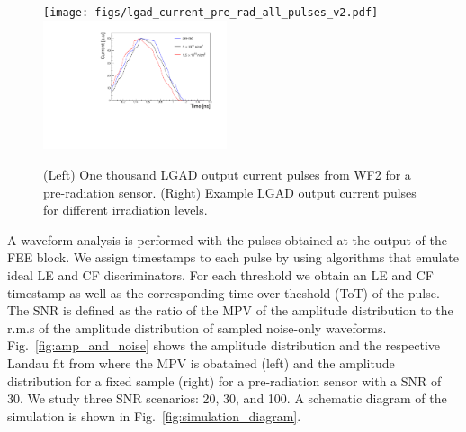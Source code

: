 \documentclass[preprint,1p]{elsarticle}
\begin{document}
 \begin{figure}[htbp]
   \centering
   \texttt{[image: figs/lgad\_current\_pre\_rad\_all\_pulses\_v2.pdf]} \hfill
   \includegraphics[width=0.48\textwidth]{figs/LGAD_current_all_irradiations_v2.pdf}
   \caption{(Left) One thousand LGAD output current pulses from WF2 for a pre-radiation sensor.
   (Right) Example LGAD output current pulses for different irradiation levels.}
   \label{fig:lgad_current}
 \end{figure}


A waveform analysis is performed with the pulses obtained at the output of the
FEE block. We assign timestamps to each pulse by using algorithms that emulate
ideal LE and CF discriminators. For each threshold we obtain an LE and CF
timestamp as well as the corresponding time-over-theshold (ToT) of the pulse.
The SNR is defined as the ratio of the MPV of the amplitude distribution to the
r.m.s of the amplitude distribution of sampled noise-only waveforms.
Fig.~\ref{fig:amp_and_noise} shows the amplitude distribution and the respective Landau fit
from where the MPV is obatained (left) and the amplitude distribution for a fixed sample (right)
for a pre-radiation sensor with a SNR of 30.
We study three SNR scenarios: 20, 30, and 100. A schematic diagram of the
simulation is shown in Fig.~\ref{fig:simulation_diagram}.
\end{document}
